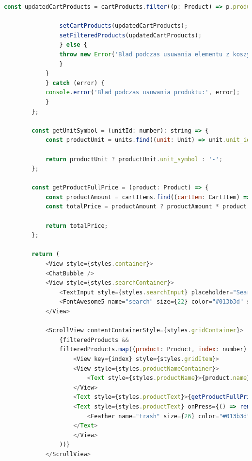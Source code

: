 \begin{lstlisting}[language=JavaScript, caption=Koszyk użytkownika implementacja, label=lst:cart_view]
                const updatedCartProducts = cartProducts.filter((p: Product) => p.product_id !== product.product_id);

                setCartProducts(updatedCartProducts);
                setFilteredProducts(updatedCartProducts);
                } else {
                throw new Error('Blad podczas usuwania elementu z koszyka');
                }
            }
            } catch (error) {
            console.error('Blad podczas usuwania produktu:', error);
            }
        };

        const getUnitSymbol = (unitId: number): string => {
            const productUnit = units.find((unit: Unit) => unit.unit_id === unitId);

            return productUnit ? productUnit.unit_symbol : '-';
        };

        const getProductFullPrice = (product: Product) => {
            const productAmount = cartItems.find((cartIem: CartItem) => cartIem.product_id === product.product_id)?.quantity;
            const totalPrice = productAmount ? productAmount * product.price : '-';

            return totalPrice;
        };

        return (
            <View style={styles.container}>
            <ChatBubble />
            <View style={styles.searchContainer}>
                <TextInput style={styles.searchInput} placeholder="Search products" value={searchQuery} onChangeText={handleSearch} selectionColor="#013b3d" />
                <FontAwesome5 name="search" size={22} color="#013b3d" style={styles.searchIcon} />
            </View>

            <ScrollView contentContainerStyle={styles.gridContainer}>
                {filteredProducts &&
                filteredProducts.map((product: Product, index: number) => (
                    <View key={index} style={styles.gridItem}>
                    <View style={styles.productNameContainer}>
                        <Text style={styles.productName}>{product.name}</Text>
                    </View>
                    <Text style={styles.productText}>{getProductFullPrice(product) + ' $'}</Text>
                    <Text style={styles.productText} onPress={() => removeFromCart(product)}>
                        <Feather name="trash" size={26} color="#013b3d" style={styles.searchIcon} />
                    </Text>
                    </View>
                ))}
            </ScrollView>


\end{lstlisting}
